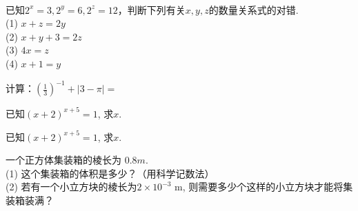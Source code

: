 \\
\item{
    已知$2^x=3, 2^y=6, 2^z=12$，判断下列有关$x, y, z$的数量关系式的对错.\\
    (1) $x+z=2y$\\
    (2) $x+y+3=2z$\\
    (3) $4x=z$\\
    (4) $x+1=y$
}
\\
\item{
    计算：$ (\frac{1}{3})^{-1} + \lvert 3-\pi \rvert = $
}
\\
\item{
    已知$(x+2)^{x+5}=1$, 求$x$.
}
\\
\item{
    已知$(x+2)^{x+5}=1$, 求$x$.
}
\\
\item{
    一个正方体集装箱的棱长为 $0.8 m$.\\
    (1) 这个集装箱的体积是多少？（用科学记数法）\\
    (2) 若有一个小立方块的棱长为$2\times 10^{-3} $ m, 则需要多少个这样的小立方块才能将集装箱装满？
}